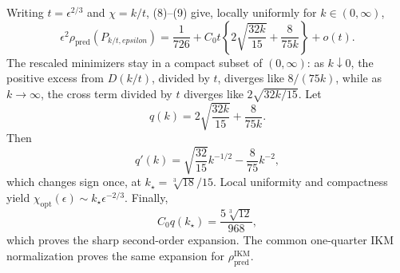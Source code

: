 Writing \(t=\epsilon^{2/3}\) and \(\chi=k/t\), (8)--(9) give, locally uniformly for \(k\in(0,\infty)\),
\[
 \epsilon^2\rho_{\mathrm{pred}}(P_{k/t,epsilon})
 =\frac1{726}+C_0t\left\{2\sqrt{\frac{32k}{15}}+\frac8{75k}\right\}+o(t). \tag{10}
\]
The rescaled minimizers stay in a compact subset of \((0,\infty)\): as \(k\downarrow0\), the positive excess from \(D(k/t)\), divided by \(t\), diverges like \(8/(75k)\), while as \(k\to\infty\), the cross term divided by \(t\) diverges like \(2\sqrt{32k/15}\). Let
\[
 q(k)=2\sqrt{\frac{32k}{15}}+\frac8{75k}.
\]
Then
\[
 q'(k)=\sqrt{\frac{32}{15}}k^{-1/2}-\frac8{75}k^{-2},
\]
which changes sign once, at \(k_\star=\sqrt[3]{18}/15\). Local uniformity and compactness yield \(\chi_{\mathrm{opt}}(\epsilon)\sim k_\star\epsilon^{-2/3}\). Finally,
\[
 C_0q(k_\star)=\frac{5\sqrt[3]{12}}{968},
\]
which proves the sharp second-order expansion. The common one-quarter IKM normalization proves the same expansion for \(\rho_{\mathrm{pred}}^{\mathrm{IKM}}\).